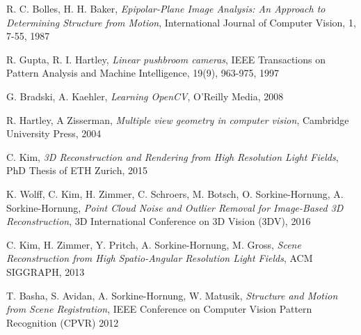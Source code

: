 \documentclass[11pt, english, singlespacing, headsepline, ]{MastersDoctoralThesis}
\theoremstyle{definition}
\begin{document}
\begin{thebibliography}{90}
	R. C. Bolles, H. H. Baker,
	\emph{Epipolar-Plane Image Analysis: An Approach to Determining Structure from Motion},
	International Journal of Computer Vision, 1, 7-55,
	1987

	R. Gupta, R. I. Hartley, 
	\emph{Linear pushbroom cameras},
	IEEE Transactions on Pattern Analysis and Machine Intelligence, 19(9), 963-975,
	1997

	G. Bradski, A. Kaehler,
	\emph{Learning OpenCV},
	O'Reilly Media, 2008

	R. Hartley, A Zisserman,
	\emph{Multiple view geometry in computer vision},
	Cambridge University Press,
	2004

	C. Kim, 
	\emph{3D Reconstruction and Rendering from High Resolution Light Fields},
	PhD Thesis of ETH Zurich, 2015

	K. Wolff, C. Kim, H. Zimmer, C. Schroers, M. Botsch, O. Sorkine-Hornung, A. Sorkine-Hornung,
	\emph{Point Cloud Noise and Outlier Removal for Image-Based 3D Reconstruction},
	3D International Conference on 3D Vision (3DV), 2016

	C. Kim, H. Zimmer, Y. Pritch, A. Sorkine-Hornung, M. Gross,
	\emph{Scene Reconstruction from High Spatio-Angular Resolution Light Fields},
	ACM SIGGRAPH, 2013

	T. Basha, S. Avidan, A. Sorkine-Hornung, W. Matusik,
	\emph{Structure and Motion from Scene Registration},
	IEEE Conference on Computer Vision Pattern Recognition (CPVR) 2012
	
	
	

\end{thebibliography}

\end{document}
